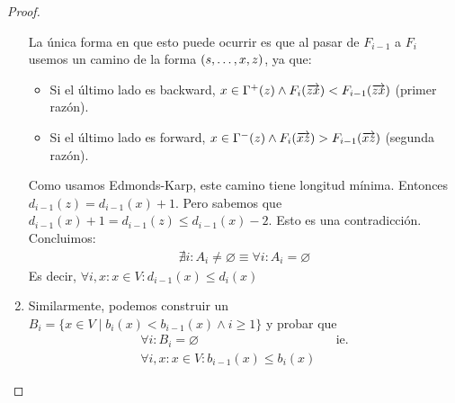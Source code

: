 \begin{proof}
\begin{enumerate}
    La única forma en que esto puede ocurrir es que al pasar de $F_{i-1}$ a $F_i$ usemos un camino de la forma $(s, \mathellipsis, x, z)$, ya que:
    \begin{itemize}
    \item Si el último lado es backward, $x \in \Gamma^+(z) \wedge F_{i}(\overrightarrow{zx}) < F_{i-1}(\overrightarrow{zx})$ (primer razón).
    \item Si el último lado es forward, $x \in \Gamma^-(z) \wedge F_{i}(\overrightarrow{xz}) > F_{i-1}(\overrightarrow{xz})$ (segunda razón).
    \end{itemize}
    Como usamos Edmonds-Karp, este camino tiene longitud mínima.
    Entonces $d_{i-1}(z) = d_{i-1}(x) + 1$. Pero sabemos que $d_{i-1}(x) + 1  = d_{i-1}(z) \le d_{i-1}(x) - 2$. Esto es una contradicción. Concluimos:
    \begin{align}
      \nexists i : A_i \neq \varnothing
      \equiv
      \forall i : A_i = \varnothing
    \end{align}
    Es decir, $\forall i, x : x \in V : d_{i-1}(x) \le d_i(x)$
  \item
    Similarmente, podemos construir un $B_i = \{x \in V \mid b_i(x) < b_{i-1}(x) \wedge i \ge 1\}$ y probar que
    \begin{align}
      \forall i : B_i = \varnothing && \text{ie.}\\
      \forall i, x : x \in V : b_{i-1}(x) \le b_i(x)
    \end{align}
  \end{enumerate}
\end{proof}


